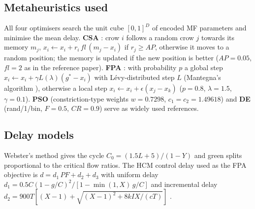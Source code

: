 \subsection{Metaheuristics used}
All four optimisers search the unit cube $[0,1]^D$ of encoded MF parameters and minimise the mean delay.
\textbf{CSA} \cite{askarzadeh2016}: crow $i$ follows a random crow $j$ towards its memory $m_j$,
$x_i\leftarrow x_i+r_i\,fl\,(m_j-x_i)$ if $r_j\ge AP$, otherwise it moves to a random position; the memory is updated if the new position is better
($AP=0.05$, $fl=2$ as in the reference paper). \textbf{FPA} \cite{yang2012}: with probability $p$ a global step
$x_i\leftarrow x_i+\gamma L(\lambda)(g^*-x_i)$ with L\'evy-distributed step $L$ (Mantegna's algorithm \cite{mantegna1994}), otherwise a local step
$x_i\leftarrow x_i+\epsilon(x_j-x_k)$ ($p=0.8$, $\lambda=1.5$, $\gamma=0.1$). \textbf{PSO} \cite{kennedy1995} (constriction-type
weights $w=0.7298$, $c_1=c_2=1.49618$) and \textbf{DE} \cite{storn1997} (rand/1/bin, $F=0.5$, $CR=0.9$) serve as widely used references.

\subsection{Delay models}
Webster's method \cite{webster1958} gives the cycle $C_0=(1.5L+5)/(1-Y)$ and green splits proportional to the critical flow ratios.
The HCM control delay used as the FPA objective is $d=d_1\,PF+d_2+d_3$ with uniform delay $d_1=0.5C(1-g/C)^2/[1-\min(1,X)\,g/C]$ and incremental
delay $d_2=900T[(X-1)+\sqrt{(X-1)^2+8kIX/(cT)}]$ \cite{hcm2000}.
